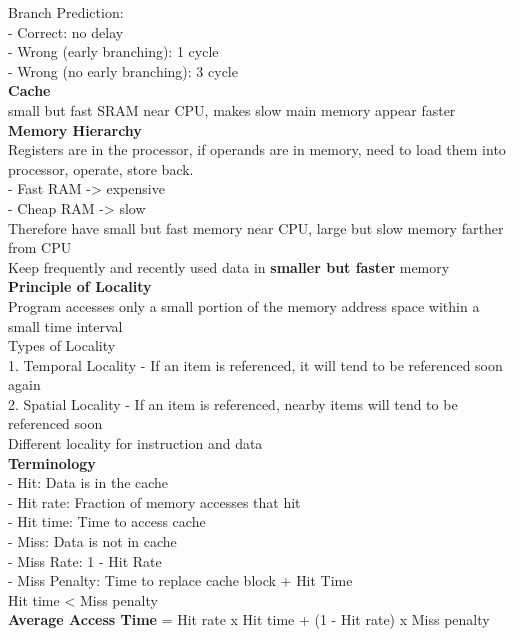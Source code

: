 \documentclass[10pt, a4paper]{article}
\newcommand{\highlight}[1]{{\color{red}\textbf{#1}}}
\newcommand{\red}[1]{{\color{red}#1}}
\newcommand{\green}[1]{{\color{ForestGreen}#1}}
\begin{document}
\begin{multicols*}{3}
		Branch Prediction:\\
		- Correct: no delay\\
		- Wrong (early branching): 1 cycle\\
		- Wrong (no early branching): 3 cycle\\

		{\normalsize\textbf{Cache}}\\
		small but fast SRAM near CPU, makes slow main memory appear faster\\

		\textbf{Memory Hierarchy}\\
		Registers are in the processor, if operands are in memory, need to load them into processor, operate, store back.\\
		- Fast RAM -> expensive\\
		- Cheap RAM -> slow\\
		Therefore have small but fast memory near CPU, large but slow memory farther from CPU\\
		Keep frequently and recently used data in \highlight{smaller but faster} memory\\

		\textbf{Principle of Locality}\\
		Program accesses only a small portion of the memory address space within a small time interval\\
		Types of Locality\\
		1. Temporal Locality - If an item is referenced, it will tend to be referenced soon again\\
		2. Spatial Locality - If an item is referenced, nearby items will tend to be referenced soon\\
		Different locality for instruction and data\\

		\textbf{Terminology}\\
		- \green{Hit}: Data is in the cache\\
		- \green{Hit rate}: Fraction of memory accesses that hit\\
		- \green{Hit time}: Time to access cache\\
		- \red{Miss}: Data is not in cache\\
		- \red{Miss Rate}: 1 - \green{Hit Rate}\\
		- \red{Miss Penalty}: Time to replace cache block + \green{Hit Time}\\
		Hit time < Miss penalty\\
		\highlight{Average Access Time} = Hit rate x Hit time + (1 - Hit rate) x Miss penalty\\


\end{multicols*}
\end{document}
